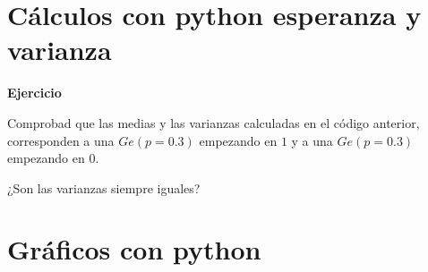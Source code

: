 \documentclass[
  letterpaper,
  DIV=11,
  numbers=noendperiod]{scrreprt}
\begin{document}
\section{Cálculos con python esperanza y
varianza}\label{cuxe1lculos-con-python-esperanza-y-varianza-1}

\textbf{Ejercicio}

Comprobad que las medias y las varianzas calculadas en el código
anterior, corresponden a una \(Ge(p=0.3)\) empezando en \(1\) y a una
\(Ge(p=0.3)\) empezando en \(0\).

¿Son las varianzas siempre iguales?

\section{Gráficos con python}\label{gruxe1ficos-con-python}
\end{document}
